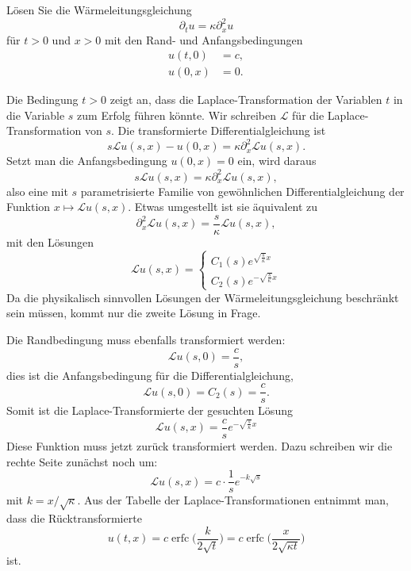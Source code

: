 Lösen Sie die Wärmeleitungsgleichung
\[
\partial_t u=\kappa\partial_x^2u
\]
für $t>0$ und $x>0$ mit den Rand- und Anfangsbedingungen
\begin{align*}
u(t,0)&=c,\\
u(0,x)&=0.
\end{align*}

\begin{loesung}
Die Bedingung $t>0$ zeigt an, dass die Laplace-Transformation
der Variablen $t$ in die Variable $s$ zum Erfolg führen könnte.
Wir schreiben $\mathscr{L}$ für die Laplace-Transformation von $s$.
Die transformierte Differentialgleichung ist
\[
s\mathscr{L}u(s, x)-u(0,x)=\kappa \partial_x^2\mathscr{L}u(s,x).
\]
Setzt man die Anfangsbedingung $u(0,x)=0$ ein, wird daraus
\[
s\mathscr{L}u(s, x)=\kappa \partial_x^2\mathscr{L}u(s,x),
\]
also eine mit $s$ parametrisierte Familie von gewöhnlichen
Differentialgleichung der Funktion $x\mapsto \mathscr{L}u(s,x)$.
Etwas umgestellt ist sie äquivalent zu
\[
\partial_x^2\mathscr{L}u(s,x)
=
\frac{s}{\kappa}\mathscr{L}u(s, x),
\]
mit den Lösungen
\[
\mathscr{L}u(s,x)=\begin{cases}
C_1(s)e^{\sqrt{\frac{s}{\kappa}}x}\\
C_2(s)e^{-\sqrt{\frac{s}{\kappa}}x}
\end{cases}
\]
Da die physikalisch sinnvollen Lösungen der Wärmeleitungsgleichung
beschränkt sein müssen, kommt nur die zweite Lösung in Frage.

Die Randbedingung muss ebenfalls transformiert werden:
\[
\mathscr{L}u(s,0)=\frac{c}{s},
\]
dies ist die Anfangsbedingung für die Differentialgleichung,
\[
\mathscr{L}u(s,0)=C_2(s)=\frac{c}{s}.
\]
Somit ist die Laplace-Transformierte der gesuchten Lösung
\[
\mathscr{L}u(s,x)=\frac{c}{s}e^{-\sqrt{\frac{s}{\kappa}}x}
\]
Diese Funktion muss jetzt zurück transformiert werden.
Dazu schreiben wir die rechte Seite zunächst noch um:
\[
\mathscr{L}u(s,x)=c\cdot \frac{1}{s}e^{-k\sqrt{s}}
\]
mit $k=x/\sqrt{\kappa}$.
Aus der
Tabelle der Laplace-Transformationen entnimmt man, dass die
Rücktransformierte
\[
u(t,x)
=
c \operatorname{erfc}\biggl(
\frac{k}{2\sqrt{t}}
\biggr)
=
c \operatorname{erfc}\biggl(
\frac{x}{2\sqrt{\kappa t}}
\biggr)
\]
ist.
\end{loesung}

